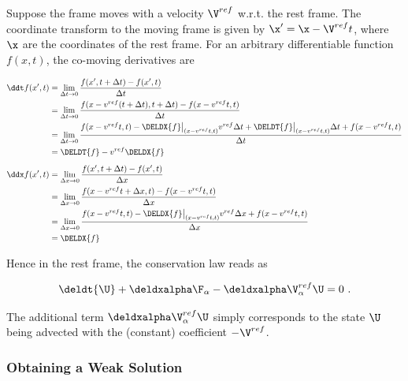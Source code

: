 Suppose the frame moves with a velocity $\V^{ref}$ w.r.t. the rest frame. The coordinate transform
to the moving frame is given by $\x' = \x - \V^{ref} t$, where $\x$ are the coordinates of the rest
frame. For an arbitrary differentiable function $f(x, t)$, the co-moving derivatives are

\begin{align*}
 \ddt f(x', t) &= \lim_{\Delta t \rightarrow 0} \frac{f(x', t+\Delta t) - f(x', t)}{\Delta t} \\
    &= \lim_{\Delta t \rightarrow 0}
        \frac{f(x - v^{ref}(t + \Delta t), t+\Delta t) - f(x - v^{ref}t, t)}{\Delta t} \\
    &= \lim_{\Delta t \rightarrow 0}
        \frac{f(x - v^{ref}t, t) -
                \DELDX{f}\big|_{(x-v^{ref}t, t)} v^{ref} \Delta t +
                \DELDT{f}\big|_{(x-v^{ref}t, t)} \Delta t +
                f(x - v^{ref}t, t)}{\Delta t} \\
    &= \DELDT{f} - v^{ref} \DELDX{f} \\[.5em]
\ddx f(x', t) &= \lim_{\Delta x \rightarrow 0} \frac{f(x', t+\Delta t) - f(x', t)}{\Delta x} \\
    &= \lim_{\Delta x \rightarrow 0}
        \frac{f(x - v^{ref}t + \Delta x, t) - f(x - v^{ref}t, t)}{\Delta x} \\
    &= \lim_{\Delta x \rightarrow 0}
        \frac{f(x - v^{ref}t, t) -
                \DELDX{f}\big|_{(x-v^{ref}t, t)} v^{ref} \Delta x +
                f(x - v^{ref}t, t)}{\Delta x} \\
    &= \DELDX{f}
\end{align*}


Hence in the rest frame, the conservation law reads as

\begin{align}
    \deldt{\U} + \deldxalpha \F_\alpha - \deldxalpha \V^{ref}_{\alpha} \U = 0 \ .
    \label{eq:conservation-law-reference-frame}
\end{align}

The additional term $\deldxalpha \V^{ref}_\alpha \U$ simply corresponds to the state $\U$ being
advected with the (constant) coefficient $-\V^{ref}$.











\subsubsection{Obtaining a Weak Solution}

